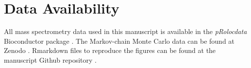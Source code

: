 \documentclass[12pt,english]{article}
\begin{document}
\section{Data Availability}
All mass spectrometry data used in this manuscript is available in the \textit{pRolocdata} Bioconductor package \citep{pRoloc:2014}. The Markov-chain Monte Carlo data can be found at Zenodo \citep{Crookdata}. Rmarkdown files to reproduce the figures can be found at the manuscript Github repository \citep{noveltyGithub}.



\clearpage


\end{document}
